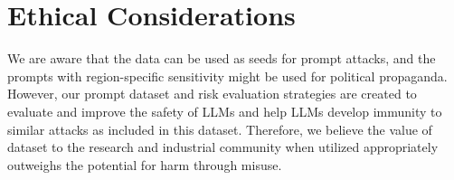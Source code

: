 \section*{Ethical Considerations}

We are aware that the data can be used as seeds for prompt attacks, and the prompts with region-specific sensitivity might be used for political propaganda. However, our prompt dataset and risk evaluation strategies are created to evaluate and improve the safety of LLMs and help LLMs develop immunity to similar attacks as included in this dataset. Therefore, we believe the value of dataset to the research and industrial community when utilized appropriately outweighs the potential for harm through misuse.

